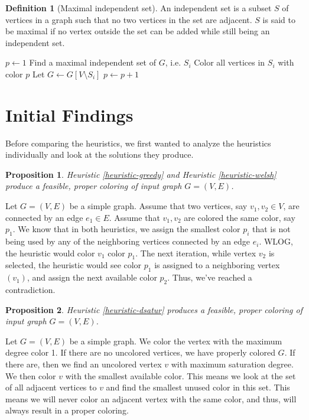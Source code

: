 \documentclass{article}
\newcounter{heuristic} \setcounter{heuristic}{0}
\newtheorem{prop}{Proposition}
\theoremstyle{definition}
\newtheorem{definition}{Definition}
\begin{document}
\begin{definition}[Maximal independent set]\label{def:mis}
An independent set is a subset $S$ of vertices in a graph such that no two vertices in the set are adjacent. $S$ is said to be maximal if no vertex outside the set can be added while still being an independent set.
\end{definition}

\begin{algorithm}
\caption{Maximal independent set algorithm}\label{alg:mis}
\begin{algorithmic}[1]
\State $p \leftarrow 1$
\State Find a maximal independent set of $G$, i.e. $S_i$
\State Color all vertices in $S_i$ with color $p$
\State Let $G \leftarrow G[V \setminus S_i ] $
\State $p \leftarrow p + 1$
\EndWhile
\end{algorithmic}
\end{algorithm}

\section{Initial Findings}
Before comparing the heuristics, we first wanted to analyze the heuristics individually and look at the solutions they produce.

\begin{prop}
Heuristic \ref{heuristic-greedy} and Heuristic \ref{heuristic-welsh} produce a feasible, proper coloring of input graph \(G = (V, E)\).
\end{prop}

Let \(G = (V, E)\) be a simple graph. Assume that two vertices, say \(v_1, v_2 \in V\), are connected by an edge \(e_1 \in E\). Assume that \(v_1, v_2\) are colored the same color, say \(p_1\). We know that in both heuristics, we assign the smallest color \(p_i\) that is not being used by any of the neighboring vertices connected by an edge \(e_i\). WLOG, the heuristic would color \(v_1\) color \(p_1\). The next iteration, while vertex \(v_2\) is selected, the heuristic would see color \(p_1\) is assigned to a neighboring vertex \((v_1)\), and assign the next available color \(p_2\). Thus, we've reached a contradiction.

\begin{prop}
Heuristic \ref{heuristic-dsatur} produces a feasible, proper coloring of input graph \(G = (V, E)\).
\end{prop}

Let \(G = (V, E)\) be a simple graph. We color the vertex with the maximum degree color 1. If there are no uncolored vertices, we have properly colored $G$. If there are, then we find an uncolored vertex $v$ with maximum saturation degree. We then color $v$ with the smallest available color. This means we look at the set of all adjacent vertices to $v$ and find the smallest unused color in this set. This means we will never color an adjacent vertex with the same color, and thus, will always result in a proper coloring.
\end{document}
